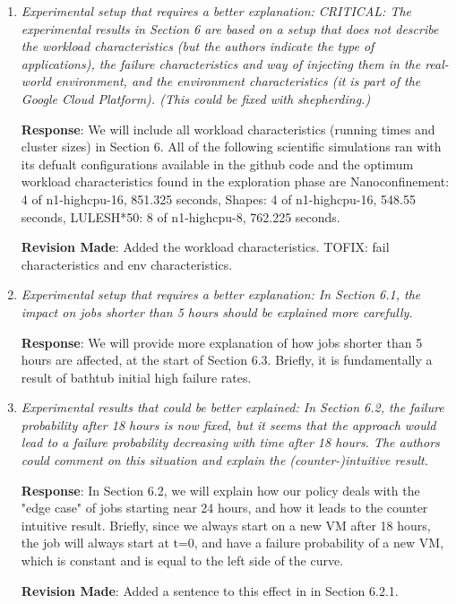 \documentclass{article}
\newcommand{\resp}[1]{\textbf{Response}: #1}
\newcommand{\revmade}[1]{\textbf{Revision Made}: #1}
\begin{document}
\begin{enumerate}
\resp{We will go over all results and present ranges wherever required, and be more precise when summarizing the results, especially when explaining Figure 5, 6. }

\revmade{Made clarification changes in the entire eval section when explaining results.}

\item \emph{Experimental setup that requires a better explanation: CRITICAL: The experimental results in Section 6 are based on a setup that does not describe the workload characteristics (but the authors indicate the type of applications), the failure characteristics and way of injecting them in the real-world environment, and the environment characteristics (it is part of the Google Cloud Platform). (This could be fixed with shepherding.)}

\resp{We will include all workload characteristics (running times and cluster sizes) in Section 6.
All of the following scientific simulations ran with its defualt configurations available in the github code and the optimum workload characteristics found in the exploration phase are Nanoconfinement: 4 of n1-highcpu-16, 851.325 seconds,
Shapes: 4 of n1-highcpu-16, 548.55 seconds,
LULESH*50: 8 of n1-highcpu-8, 762.225 seconds.
}
\revmade{Added the workload characteristics. TOFIX: fail characteristics and env characteristics.}

\item \emph{Experimental setup that requires a better explanation: In Section 6.1, the impact on jobs shorter than 5 hours should be explained more carefully. }

\resp{We will provide more explanation of how jobs shorter than 5 hours are affected, at the start of Section 6.3. Briefly, it is fundamentally a result of bathtub initial high failure rates.} 

\item \emph{Experimental results that could be better explained:  In Section 6.2, the failure probability after 18 hours is now fixed, but it seems that the approach would lead to a failure probability decreasing with time after 18 hours. The authors could comment on this situation and explain the (counter-)intuitive result.}

\resp{In Section 6.2, we will explain how our policy deals with the "edge case" of jobs starting near 24 hours, and how it leads to the counter intuitive result. Briefly, since we always start on a new VM after 18 hours, the job will always start at t=0, and have a failure probability of a new VM, which is constant and is equal to the left side of the curve.}

\revmade{Added a sentence to this effect in in Section 6.2.1.}

\end{enumerate}
\end{document}
